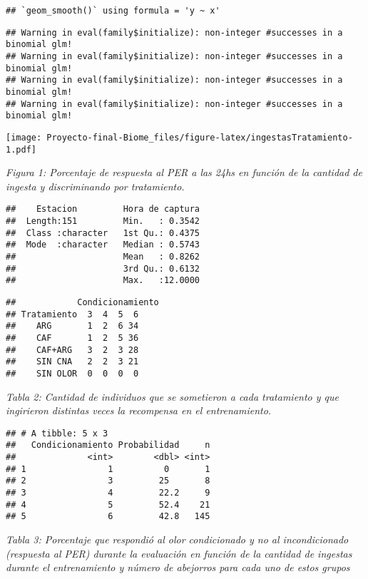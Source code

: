 \documentclass[
  11pt,
]{article}
\begin{document}
\begin{verbatim}
## `geom_smooth()` using formula = 'y ~ x'
\end{verbatim}

\begin{verbatim}
## Warning in eval(family$initialize): non-integer #successes in a binomial glm!
## Warning in eval(family$initialize): non-integer #successes in a binomial glm!
## Warning in eval(family$initialize): non-integer #successes in a binomial glm!
## Warning in eval(family$initialize): non-integer #successes in a binomial glm!
\end{verbatim}

\texttt{[image: Proyecto-final-Biome\_files/figure-latex/ingestasTratamiento-1.pdf]}

\emph{Figura 1: Porcentaje de respuesta al PER a las 24hs en función de
la cantidad de ingesta y discriminando por tratamiento.}

\begin{verbatim}
##    Estacion         Hora de captura  
##  Length:151         Min.   : 0.3542  
##  Class :character   1st Qu.: 0.4375  
##  Mode  :character   Median : 0.5743  
##                     Mean   : 0.8262  
##                     3rd Qu.: 0.6132  
##                     Max.   :12.0000
\end{verbatim}

\begin{verbatim}
##            Condicionamiento
## Tratamiento  3  4  5  6
##    ARG       1  2  6 34
##    CAF       1  2  5 36
##    CAF+ARG   3  2  3 28
##    SIN CNA   2  2  3 21
##    SIN OLOR  0  0  0  0
\end{verbatim}

\emph{Tabla 2: Cantidad de individuos que se sometieron a cada
tratamiento y que ingirieron distintas veces la recompensa en el
entrenamiento.}

\begin{verbatim}
## # A tibble: 5 x 3
##   Condicionamiento Probabilidad     n
##              <int>        <dbl> <int>
## 1                1          0       1
## 2                3         25       8
## 3                4         22.2     9
## 4                5         52.4    21
## 5                6         42.8   145
\end{verbatim}

\emph{Tabla 3: Porcentaje que respondió al olor condicionado y no al
incondicionado (respuesta al PER) durante la evaluación en función de la
cantidad de ingestas durante el entrenamiento y número de abejorros para
cada uno de estos grupos}
\end{document}
